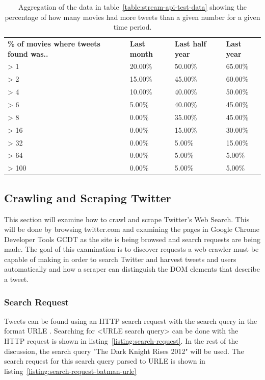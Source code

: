 \begin{table}[H]
\centering
\begin{tabularx}{5.3\textwidth}{ |p{7cm}|p{1cm}|p{1cm}|p{1cm}| }
\textbf{\% of movies where tweets found was..} & \textbf{Last month} & \textbf{Last half year} & \textbf{Last year}\\
  \cline{0-3}
> 1 & 20.00\% & 50.00\% & 65.00\%\\
  \cline{0-3}
> 2 & 15.00\% & 45.00\% & 60.00\%\\
  \cline{0-3}
> 4 & 10.00\% & 40.00\% & 50.00\%\\
  \cline{0-3}
> 6 & 5.00\% & 40.00\% & 45.00\%\\
  \cline{0-3}
> 8 & 0.00\% & 35.00\% & 45.00\%\\
  \cline{0-3}
> 16 & 0.00\% & 15.00\% & 30.00\%\\
  \cline{0-3}
> 32 & 0.00\% & 5.00\% & 15.00\%\\
  \cline{0-3}
> 64 & 0.00\% & 5.00\% & 5.00\%\\
  \cline{0-3}
> 100 & 0.00\% & 5.00\% & 5.00\%
\end{tabularx}
\caption[Stream API capability test aggregation]{Aggregation of the data in table~\ref{table:stream-api-test-data} showing the percentage of how many movies had more tweets than a given number for a given time period.}
\label{table:stream-api-test-data-aggregate}
\end{table}




\subsection{Crawling and Scraping Twitter}\label{sec:pre-twitter-crawl-scrape}
This section will examine how to crawl and scrape Twitter's Web Search. This will be done by browsing twitter.com and examining the pages in Google Chrome Developer Tools GCDT\cite{gcdt} as the site is being browsed and search requests are being made. The goal of this examination is to discover requests a web crawler must be capable of making in order to search Twitter and harvest tweets and users automatically and how a scraper can distinguish the DOM elements that describe a tweet.


\subsubsection{Search Request}
Tweets can be found using an HTTP search request with the search query in the format URLE \cite{w3-urle-ref}.
Searching for <URLE search query> can be done with the HTTP request is shown in listing~\ref{listing:search-request}.
In the rest of the discussion, the search query "The Dark Knight Rises 2012" will be used. The search request for this search query parsed to URLE is shown in listing~\ref{listing:search-request-batman-urle}

